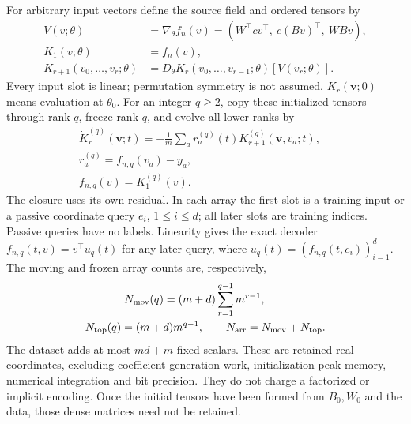 For arbitrary input vectors define the source field and ordered tensors
by \begin{equation}\label{cp:nth:eq:source}{
\begin{aligned}
V(v;\theta)&=\nabla_\theta f_n(v)
 =(W^\top cv^\top,\ c(Bv)^\top,\ WBv),\\
K_1(v;\theta)&=f_n(v),\\
K_{r+1}(v_0,\ldots,v_r;\theta)
 &=D_\theta K_r(v_0,\ldots,v_{r-1};\theta)[V(v_r;\theta)].
\end{aligned}
}\end{equation} Every input slot is linear; permutation symmetry is not
assumed. \(K_r(\mathbf v;0)\) means evaluation at \(\theta_0\). For an
integer \(q\ge2\), copy these initialized tensors through rank \(q\),
freeze rank \(q\), and evolve all lower ranks by
\begin{equation}\label{cp:nth:eq:closure}{\begin{gathered}
\dot K_r^{(q)}(\mathbf v;t)
 =-\frac1m\sum_a r_a^{(q)}(t)K_{r+1}^{(q)}(\mathbf v,v_a;t),
\quad\\ r_a^{(q)}=f_{n,q}(v_a)-y_a,\quad\\ f_{n,q}(v)=K_1^{(q)}(v).
\end{gathered}}\end{equation} The closure uses its own residual. In each
array the first slot is a training input or a passive coordinate query
\(e_i\), \(1\le i\le d\); all later slots are training indices. Passive
queries have no labels. Linearity gives the exact decoder
\(f_{n,q}(t,v)=v^\top u_q(t)\) for any later query, where
\(u_q(t)=(f_{n,q}(t,e_i))_{i=1}^d\). The moving and frozen array counts
are, respectively,
\begin{equation}\label{cp:nth:eq:counts}{\begin{gathered}
N_{\rm mov}(q)=(m+d)\sum_{r=1}^{q-1}m^{r-1},\qquad\\
N_{\rm top}(q)=(m+d)m^{q-1},\qquad N_{\rm arr}=N_{\rm mov}+N_{\rm top}.
\end{gathered}}\end{equation} The dataset adds at most \(md+m\) fixed
scalars. These are retained real coordinates, excluding
coefficient-generation work, initialization peak memory, numerical
integration and bit precision. They do not charge a factorized or
implicit encoding. Once the initial tensors have been formed from
\(B_0,W_0\) and the data, those dense matrices need not be retained.

